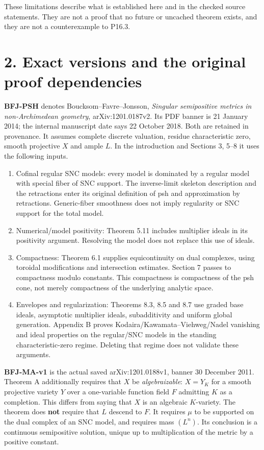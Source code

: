 \documentclass[
  11pt,
]{article}
\providecommand{\tightlist}{%
  \setlength{\itemsep}{0pt}\setlength{\parskip}{0pt}}
\begin{document}
These limitations describe what is established here and in the checked
source statements. They are not a proof that no future or uncached
theorem exists, and they are not a counterexample to P16.3.

\section{2. Exact versions and the original proof
dependencies}\label{exact-versions-and-the-original-proof-dependencies}

\textbf{BFJ-PSH} denotes Boucksom--Favre--Jonsson, \emph{Singular
semipositive metrics in non-Archimedean geometry}, arXiv:1201.0187v2.
Its PDF banner is 21 January 2014; the internal manuscript date says 22
October 2018. Both are retained in provenance. It assumes complete
discrete valuation, residue characteristic zero, smooth projective \(X\)
and ample \(L\). In the introduction and Sections 3, 5--8 it uses the
following inputs.

\begin{enumerate}
\def\labelenumi{\arabic{enumi}.}
\tightlist
\item
  Cofinal regular SNC models: every model is dominated by a regular
  model with special fiber of SNC support. The inverse-limit skeleton
  description and the retractions enter its original definition of psh
  and approximation by retractions. Generic-fiber smoothness does not
  imply regularity or SNC support for the total model.
\item
  Numerical/model positivity: Theorem 5.11 includes multiplier ideals in
  its positivity argument. Resolving the model does not replace this use
  of ideals.
\item
  Compactness: Theorem 6.1 supplies equicontinuity on dual complexes,
  using toroidal modifications and intersection estimates. Section 7
  passes to compactness modulo constants. This compactness is
  compactness of the psh cone, not merely compactness of the underlying
  analytic space.
\item
  Envelopes and regularization: Theorems 8.3, 8.5 and 8.7 use graded
  base ideals, asymptotic multiplier ideals, subadditivity and uniform
  global generation. Appendix B proves Kodaira/Kawamata--Viehweg/Nadel
  vanishing and ideal properties on the regular/SNC models in the
  standing characteristic-zero regime. Deleting that regime does not
  validate these arguments.
\end{enumerate}

\textbf{BFJ-MA-v1} is the actual saved arXiv:1201.0188v1, banner 30
December 2011. Theorem A additionally requires that \(X\) be
\emph{algebraizable}: \(X=Y_K\) for a smooth projective variety \(Y\)
over a one-variable function field \(F\) admitting \(K\) as a
completion. This differs from saying that \(X\) is an algebraic
\(K\)-variety. The theorem does \textbf{not} require that \(L\) descend
to \(F\). It requires \(\mu\) to be supported on the dual complex of an
SNC model, and requires mass \((L^n)\). Its conclusion is a continuous
semipositive solution, unique up to multiplication of the metric by a
positive constant.
\end{document}
